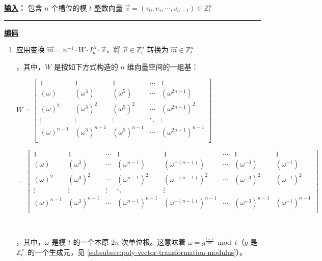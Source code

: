 \begin{tcolorbox}[title={\textbf{\tboxlabel{\ref*{subsubsec:bfv-encoding-summary}} BFV 的编码与解码}}]



\textbf{\underline{输入}：} 包含 $n$ 个槽位的模 $t$ 整数向量 $\vec{v} = (v_0, v_1, \cdots, v_{n-1}) \in \mathbb{Z}_t^n$

\par\noindent\rule{\textwidth}{0.4pt}

\textbf{\underline{编码}}
\begin{enumerate}

\item 应用变换 $\vec{m} = n^{-1}\cdot W \cdot I_n^R \cdot \vec{v}$，将 $\vec{v} \in \mathbb{Z}_t^n$ 转换为 $\vec{m} \in \mathbb{Z}_t^n$

，其中，$W$ 是按如下方式构造的 $n$ 维向量空间的一组基：

$W =  \begin{bmatrix}
1 & 1 & 1 & \cdots & 1\\
(\omega) & (\omega^3) & (\omega^5) & \cdots & (\omega^{2n-1})\\
(\omega)^2 & (\omega^3)^2 & (\omega^5)^2 & \cdots & (\omega^{2n-1})^2\\
\vdots & \vdots & \vdots & \ddots & \vdots \\
(\omega)^{n-1} & (\omega^3)^{n-1} & (\omega^5)^{n-1} & \cdots & (\omega^{2n-1})^{n-1}\\
\end{bmatrix}$

$= \begin{bmatrix}
1 & 1 & \cdots & 1 & 1 & \cdots & 1 & 1\\
(\omega) & (\omega^3) & \cdots & (\omega^{n - 1}) & (\omega^{-(n - 1)}) & \cdots & (\omega^{-3}) & (\omega^{-1})\\
(\omega)^2 & (\omega^3)^2 & \cdots & (\omega^{n - 1})^2 & (\omega^{-(n - 1)})^2 & \cdots & (\omega^{-3})^2 & (\omega^{-1})^2\\
\vdots & \vdots & \vdots & \ddots & \vdots \\
(\omega)^{n-1} & (\omega^3)^{n-1} & \cdots & (\omega^{n - 1})^{n-1} & (\omega^{-(n - 1)})^{n-1} & \cdots & (\omega^{-3})^{n-1} & (\omega^{-1})^{n-1}\\
\end{bmatrix}$

$ $

，其中，$\omega$ 是模 $t$ 的一个本原 $2n$ 次单位根。这意味着 $\omega = g^{\frac{t - 1}{2n}} \bmod t$（$g$ 是 $\mathbb{Z}_t^{\times}$ 的一个生成元，见 \autoref{subsubsec:poly-vector-transformation-modulus}）。


\end{enumerate}
\end{tcolorbox}
